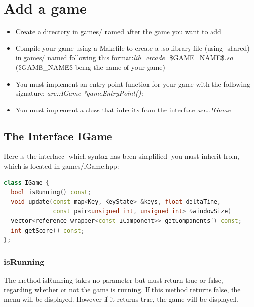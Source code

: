 \documentclass[12pt]{article}
\begin{document}
\section{Add a game}
\begin{itemize}
\item Create a directory in games/ named after the game you want to add
\item Compile your game using a Makefile to create a .so library file (using -shared) in games/ named following this format:\newline\emph{lib\_arcade\_}\$GAME\_NAME\$\emph{.so} (\$GAME\_NAME\$ being the name of your game)
\item You must implement an entry point function for your game with the following signature: \newline \emph{arc::IGame *gameEntryPoint();}
\item You must implement a class that inherits from the interface \emph{arc::IGame}
\end{itemize}
\newpage
\subsection{The Interface IGame} \label{IGame}
Here is the interface -which syntax has been simplified- you must inherit from, which is located in games/IGame.hpp:
\begin{lstlisting}[language=c++]
class IGame {
  bool isRunning() const;
  void update(const map<Key, KeyState> &keys, float deltaTime,
              const pair<unsigned int, unsigned int> &windowSize);
  vector<reference_wrapper<const IComponent>> getComponents() const;
  int getScore() const;
};
\end{lstlisting}
\subsubsection{isRunning}
The method isRunning takes no parameter but must return true or false, regarding whether or not the game is running. If this method returns false, the menu will be displayed. However if it returns true, the game will be displayed.
\end{document}

